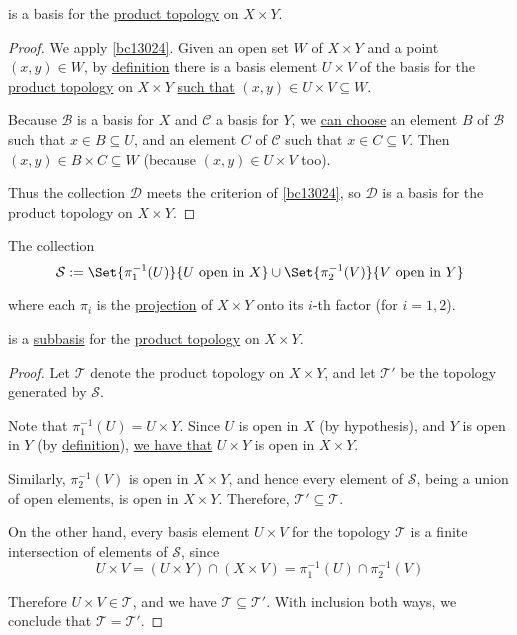 is a basis for the \href{be6372e}{product topology} on $X\times Y$.

\begin{proof}
  We apply \autoref{bc13024}. Given an open set $W$ of $X\times Y$ and
  a point $(x,y)\in W$, by \href{be6372e}{definition} there is a basis element
  $U\times V$ of the basis for the \href{be6372e}{product topology} on $X\times
  Y$ \href{e6b5306}{such that} $(x,y)\in U\times V\subseteq W$.

  Because $\mathcal B$ is a basis for $X$ and $\mathcal C$ a basis for $Y$, we
  \href{e6b5306}{can choose} an element $B$ of $\mathcal B$ such that $x\in
  B\subseteq U$, and an element $C$ of $\mathcal C$ such that $x\in C\subseteq
  V$. Then $(x,y)\in B\times C\subseteq W$ (because $(x,y)\in U\times V$ too).

  Thus the collection $\mathcal D$ meets the criterion of \autoref{bc13024}, so
  $\mathcal D$ is a basis for the product topology on $X\times Y$.
\end{proof}

\label{f0ff661}

The collection
$$
  \mathcal S:=\Set{\pi_1^{-1}(U)}{U\text{ open in }X}\cup\Set{\pi_2^{-1}(V)}{V\text{ open in }Y}
$$

where each $\pi_i$ is the \href{cad7d68}{projection} of $X\times Y$ onto its
$i$-th factor (for $i=1,2$).

is a \href{aba7b48}{subbasis} for the \href{be6372e}{product topology} on
$X\times Y$.

\begin{proof}
  \def\T{\mathcal T}

  Let $\T$ denote the product topology on $X\times Y$, and let $\T'$ be the
  topology generated by $\mathcal S$.

  Note that $\pi_1^{-1}(U)=U\times Y$. Since $U$ is open in $X$ (by
  hypothesis), and $Y$ is open in $Y$ (by \href{cc8eb8b}{definition}),
  \href{e076386}{we have that} $U\times Y$ is open in $X\times Y$.

  Similarly, $\pi_2^{-1}(V)$ is open in $X\times Y$, and hence every element of
  $\mathcal S$, being a union of open elements, is open in $X\times Y$.
  Therefore, $\T'\subseteq\T$.

  On the other hand, every basis element $U\times V$ for the topology $\T$ is a
  finite intersection of elements of $\mathcal S$, since
  $$
    U\times V=(U\times Y)\cap(X\times V)=\pi_1^{-1}(U)\cap\pi_2^{-1}(V)
  $$

  Therefore $U\times V\in\T$, and we have $\T\subseteq\T'$. With inclusion both
  ways, we conclude that $\T=\T'$.
\end{proof}
